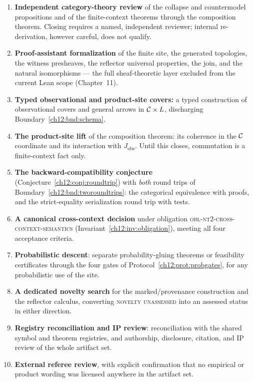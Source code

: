 \begin{protocol}
\label{ch12:prot:gates}
\begin{enumerate}
\item \textbf{Independent category-theory review} of the collapse and
countermodel propositions and of the finite-context theorems through the
composition theorem. Closing requires a named, independent reviewer;
internal re-derivation, however careful, does not qualify.
\item \textbf{Proof-assistant formalization} of the finite site, the
generated topologies, the witness presheaves, the reflector universal
properties, the join, and the natural isomorphisms --- the full
sheaf-theoretic layer excluded from the current Lean scope (Chapter~11).
\item \textbf{Typed observational and product-site covers:} a typed
construction of observational covers and general arrows in
$\mathcal{C} \times L$, discharging Boundary~\ref{ch12:bnd:schema}.
\item \textbf{The product-site lift} of the composition theorem: its
coherence in the $\mathcal{C}$ coordinate and its interaction with
$J_{\mathrm{obs}}$. Until this closes, commutation is a finite-context
fact only.
\item \textbf{The backward-compatibility conjecture}
(Conjecture~\ref{ch12:conj:roundtrip}) with \emph{both} round trips of
Boundary~\ref{ch12:bnd:tworoundtrips}: the categorical equivalence with
proofs, and the strict-equality serialization round trip with tests.
\item \textbf{A canonical cross-context decision} under obligation
\textsc{obl-nt2-cross-context-semantics}
(Invariant~\ref{ch12:inv:obligation}), meeting all four acceptance
criteria.
\item \textbf{Probabilistic descent}: separate probability-gluing theorems
or feasibility certificates through the four gates of
Protocol~\ref{ch12:prot:probgates}, for any probabilistic use of the site.
\item \textbf{A dedicated novelty search} for the marked/provenance
construction and the reflector calculus, converting
\textsc{novelty unassessed} into an assessed status in either direction.
\item \textbf{Registry reconciliation and IP review}: reconciliation with
the shared symbol and theorem registries, and authorship, disclosure,
citation, and IP review of the whole artifact set.
\item \textbf{External referee review}, with explicit confirmation that no
empirical or product wording was licensed anywhere in the artifact set.
\end{enumerate}
\end{protocol}


